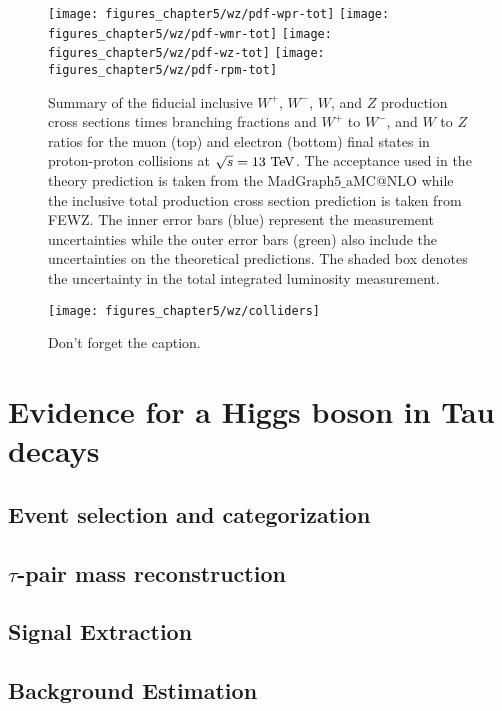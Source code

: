 \begin{figure}[h]
\centering
\texttt{[image: figures\_chapter5/wz/pdf-wpr-tot]}
\texttt{[image: figures\_chapter5/wz/pdf-wmr-tot]}
\texttt{[image: figures\_chapter5/wz/pdf-wz-tot]}
\texttt{[image: figures\_chapter5/wz/pdf-rpm-tot]}
\caption{Summary of the fiducial inclusive $W^+$, $W^-$, $W$, and $Z$ production cross sections times branching fractions and $W^+$ to $W^-$, and $W$ to $Z$ ratios for the muon (top) and electron (bottom) final states in proton-proton collisions at $\sqrt{s}=13~\mathrm{Te\kern -0.1em V}$. The acceptance used in the theory prediction is taken from the $\mathrm{MadGraph5}\_\mathrm{aMC@NLO}$ while the inclusive total production cross section prediction is taken from FEWZ. The inner error bars (blue) represent the measurement uncertainties while the outer error bars (green) also include the uncertainties on the theoretical predictions. The shaded box denotes the uncertainty in the total integrated luminosity measurement.}
\label{fig:pdf_rat}
\end{figure}

\begin{figure}[h]
\centering
\texttt{[image: figures\_chapter5/wz/colliders]}
\caption{Don't forget the caption.}
\label{fig:collider}
\end{figure}


\section{Evidence for a Higgs boson in Tau decays}

\subsection{Event selection and categorization}

\subsection{$\tau$-pair mass reconstruction}

\subsection{Signal Extraction}

\subsection{Background Estimation}

